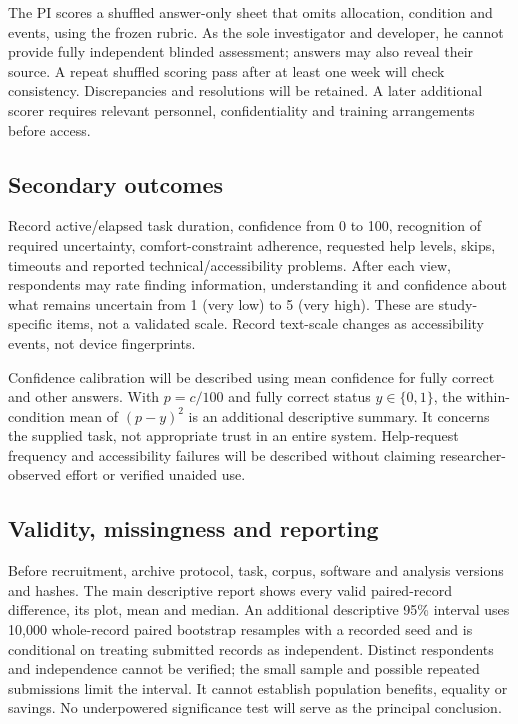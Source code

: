 \documentclass[11pt,letterpaper]{article}
\begin{document}
The PI scores a shuffled answer-only sheet that omits allocation, condition and events, using the frozen rubric. As the sole investigator and developer, he cannot provide fully independent blinded assessment; answers may also reveal their source. A repeat shuffled scoring pass after at least one week will check consistency. Discrepancies and resolutions will be retained. A later additional scorer requires relevant personnel, confidentiality and training arrangements before access.

\subsection{Secondary outcomes}
Record active/elapsed task duration, confidence from 0 to 100, recognition of required uncertainty, comfort-constraint adherence, requested help levels, skips, timeouts and reported technical/accessibility problems. After each view, respondents may rate finding information, understanding it and confidence about what remains uncertain from 1 (very low) to 5 (very high). These are study-specific items, not a validated scale. Record text-scale changes as accessibility events, not device fingerprints.

Confidence calibration will be described using mean confidence for fully correct and other answers. With $p=c/100$ and fully correct status $y\in\{0,1\}$, the within-condition mean of $(p-y)^2$ is an additional descriptive summary. It concerns the supplied task, not appropriate trust in an entire system. Help-request frequency and accessibility failures will be described without claiming researcher-observed effort or verified unaided use.

\subsection{Validity, missingness and reporting}
Before recruitment, archive protocol, task, corpus, software and analysis versions and hashes. The main descriptive report shows every valid paired-record difference, its plot, mean and median. An additional descriptive 95\% interval uses 10,000 whole-record paired bootstrap resamples with a recorded seed and is conditional on treating submitted records as independent. Distinct respondents and independence cannot be verified; the small sample and possible repeated submissions limit the interval. It cannot establish population benefits, equality or savings. No underpowered significance test will serve as the principal conclusion.
\end{document}

